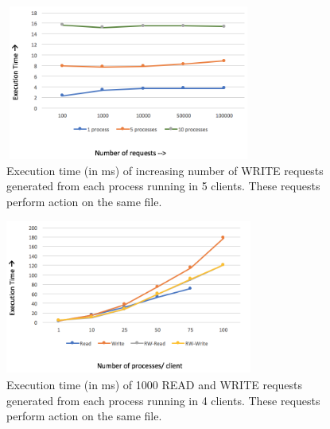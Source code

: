 \begin{figure}
\centering
\includegraphics[height=2in, width=3.2in]{images/F-HC-SF-W.png}
\caption{Execution time (in ms) of increasing number of WRITE requests generated from each process running in 5 clients. These requests perform action on the same file.}
\end{figure}

\begin{figure}
\centering
\includegraphics[height=2in, width=3.2in]{images/F-VHC-SF.png}
\caption{Execution time (in ms) of 1000 READ and WRITE requests generated from each process running in 4 clients. These requests perform action on the same file.}
\end{figure}












